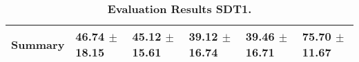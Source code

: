 \begin{table}[htb]
{\begin{tabular}{llllll}
\midrule
\textbf{Summary                                  } &                  \phantom{0}46.74 $\pm$ 18.15 &                      \phantom{0}45.12 $\pm$ 15.61 &            \phantom{0}39.12 $\pm$ 16.74 &            \phantom{0}39.46 $\pm$ 16.71 &            \phantom{0}75.70 $\pm$ 11.67 \\
\bottomrule
\end{tabular}%
}
\caption{\textbf{Evaluation Results SDT1.}}
\label{tab:eval-results}
\end{table}


